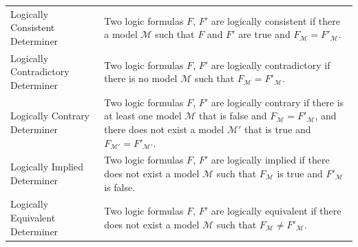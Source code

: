 \documentclass[ms]{uncgdissertationexp2}
\theoremstyle{plain}
\theoremstyle{definition}
\theoremstyle{remark}
\begin{document}
\begin{table}
\begin{tabular}{p{3cm}p{11cm}}
	  Logically Consistent Determiner&Two logic formulas $F$, $F'$ are logically consistent if there a model $\mathcal{M}$ such that $F$ and $F'$ are true and $F_{\mathcal{M}} = F'_{\mathcal{M}}.$\\
	  Logically Contradictory Determiner&Two logic formulas $F$, $F'$ are logically contradictory if there is no model $\mathcal{M}$ such that $F_{\mathcal{M}} = F'_{\mathcal{M}}.$\\
	  Logically Contrary Determiner&Two logic formulas $F$, $F'$ are logically contrary if there is at least one model $\mathcal{M}$ that is false and $F_{\mathcal{M}} = F'_{\mathcal{M}}$, and there does not exist a model $\mathcal{M'}$ that is true and $F_{\mathcal{M'}} = F'_{\mathcal{M'}}$.\\
	  Logically Implied Determiner&Two logic formulas $F$, $F'$ are logically implied if there does not exist a model $\mathcal{M}$ such that $F_{\mathcal{M}}$ is true and $F'_{\mathcal{M}}$ is false.\\
	  Logically Equivalent Determiner&Two logic formulas $F$, $F'$ are logically equivalent if there does not exist a model $\mathcal{M}$ such that $F_{\mathcal{M}} \neq F'_{\mathcal{M}}$.\\
	\bottomrule
  \end{tabular}
\end{table}
\end{document}
